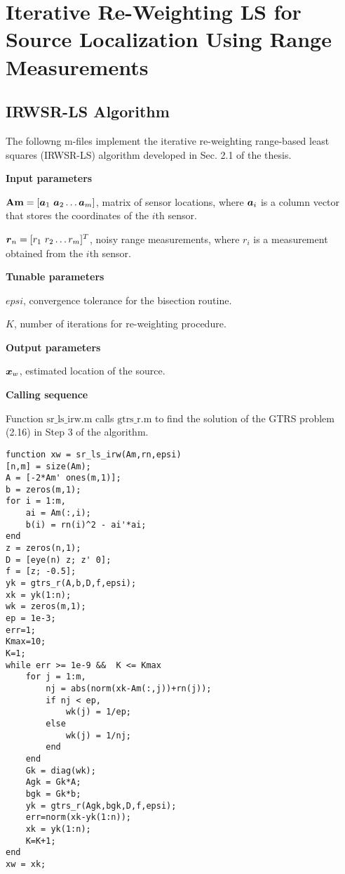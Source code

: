 \label{chapter:app2}


\section{Iterative Re-Weighting LS  for Source Localization Using Range Measurements}
\subsection{IRWSR-LS Algorithm}

The followng m-files implement the iterative re-weighting range-based least squares (IRWSR-LS) algorithm developed in Sec. 2.1 of the thesis. 

\phantom{m}

\noindent
\textbf{Input parameters}

\noindent
$\mbox{\textbf{Am}} = [\mbox{\boldmath$a$}_1 \ \mbox{\boldmath$a$}_2 \ldots \mbox{\boldmath$a$}_m]$, matrix of sensor locations, where $\mbox{\boldmath$a$}_i$ is a column vector that stores the coordinates of the $i$th sensor.

\noindent
$\mbox{\boldmath$r$}_n = [r_1 \ r_2 \ldots r_m]^T$, noisy range measurements, where $r_i$ is a measurement obtained from the $i$th sensor.

\noindent
\textbf{Tunable parameters}

\noindent
$epsi$, convergence tolerance for the bisection routine.

\noindent
$K$, number of iterations for re-weighting procedure.

\noindent
\textbf{Output parameters}

\noindent
$\mbox{\boldmath$x$}_w$, estimated location of the source.

\noindent
\textbf{Calling sequence}

\noindent
Function $\mbox{sr\_ls\_irw.m}$ calls $\mbox{gtrs\_r.m}$ to find the solution of the GTRS problem (2.16) in Step 3 of the algorithm.

\phantom{m}

\begin{lstlisting}
function xw = sr_ls_irw(Am,rn,epsi)
[n,m] = size(Am);
A = [-2*Am' ones(m,1)];
b = zeros(m,1);
for i = 1:m,
    ai = Am(:,i);
    b(i) = rn(i)^2 - ai'*ai;
end
z = zeros(n,1);
D = [eye(n) z; z' 0];
f = [z; -0.5];
yk = gtrs_r(A,b,D,f,epsi);
xk = yk(1:n);
wk = zeros(m,1);
ep = 1e-3;
err=1;
Kmax=10; 
K=1;
while err >= 1e-9 &&  K <= Kmax 
    for j = 1:m,
        nj = abs(norm(xk-Am(:,j))+rn(j));
        if nj < ep,
            wk(j) = 1/ep;
        else
            wk(j) = 1/nj;
        end
    end
    Gk = diag(wk);
    Agk = Gk*A;
    bgk = Gk*b;
    yk = gtrs_r(Agk,bgk,D,f,epsi);
    err=norm(xk-yk(1:n));
    xk = yk(1:n);
    K=K+1;
end
xw = xk;
\end{lstlisting}

